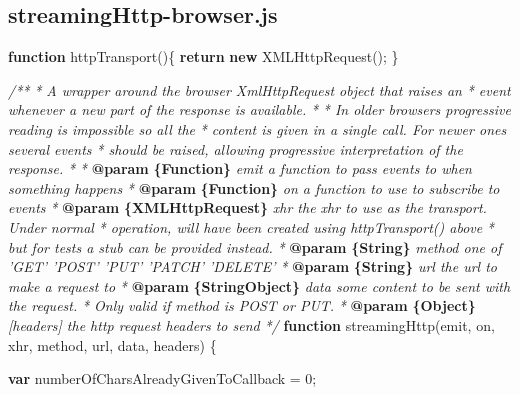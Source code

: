 \documentclass[]{article}
\newenvironment{Shaded}{}{}
\newcommand{\KeywordTok}[1]{\textcolor[rgb]{0.00,0.44,0.13}{\textbf{{#1}}}}
\newcommand{\DecValTok}[1]{\textcolor[rgb]{0.25,0.63,0.44}{{#1}}}
\newcommand{\CommentTok}[1]{\textcolor[rgb]{0.38,0.63,0.69}{\textit{{#1}}}}
\newcommand{\FunctionTok}[1]{\textcolor[rgb]{0.02,0.16,0.49}{{#1}}}
\newcommand{\NormalTok}[1]{{#1}}
\begin{document}
\pagebreak

\subsection{streamingHttp-browser.js}

\label{src_streamingHttp-browser}

\begin{Shaded}
\begin{Highlighting}[]
\KeywordTok{function} \FunctionTok{httpTransport}\NormalTok{()\{}
   \KeywordTok{return} \KeywordTok{new} \FunctionTok{XMLHttpRequest}\NormalTok{();}
\NormalTok{\}}

\CommentTok{/**}
\CommentTok{ * A wrapper around the browser XmlHttpRequest object that raises an }
\CommentTok{ * event whenever a new part of the response is available.}
\CommentTok{ * }
\CommentTok{ * In older browsers progressive reading is impossible so all the }
\CommentTok{ * content is given in a single call. For newer ones several events}
\CommentTok{ * should be raised, allowing progressive interpretation of the response.}
\CommentTok{ *      }
\CommentTok{ * }\KeywordTok{@param}\CommentTok{ }\KeywordTok{\{Function\}}\CommentTok{ emit a function to pass events to when something happens}
\CommentTok{ * }\KeywordTok{@param}\CommentTok{ }\KeywordTok{\{Function\}}\CommentTok{ on a function to use to subscribe to events}
\CommentTok{ * }\KeywordTok{@param}\CommentTok{ }\KeywordTok{\{XMLHttpRequest\}}\CommentTok{ xhr the xhr to use as the transport. Under normal}
\CommentTok{ *          operation, will have been created using httpTransport() above}
\CommentTok{ *          but for tests a stub can be provided instead.}
\CommentTok{ * }\KeywordTok{@param}\CommentTok{ }\KeywordTok{\{String\}}\CommentTok{ method one of 'GET' 'POST' 'PUT' 'PATCH' 'DELETE'}
\CommentTok{ * }\KeywordTok{@param}\CommentTok{ }\KeywordTok{\{String\}}\CommentTok{ url the url to make a request to}
\CommentTok{ * }\KeywordTok{@param}\CommentTok{ }\KeywordTok{\{String\textbar{}Object\}}\CommentTok{ data some content to be sent with the request.}
\CommentTok{ *                        Only valid if method is POST or PUT.}
\CommentTok{ * }\KeywordTok{@param}\CommentTok{ }\KeywordTok{\{Object\}}\CommentTok{ [headers] the http request headers to send                       }
\CommentTok{ */}  
\KeywordTok{function} \FunctionTok{streamingHttp}\NormalTok{(emit, on, xhr, method, url, data, headers) \{}
        
   \KeywordTok{var} \NormalTok{numberOfCharsAlreadyGivenToCallback = }\DecValTok{0}\NormalTok{;}


\end{Highlighting}
\end{Shaded}
\end{document}
